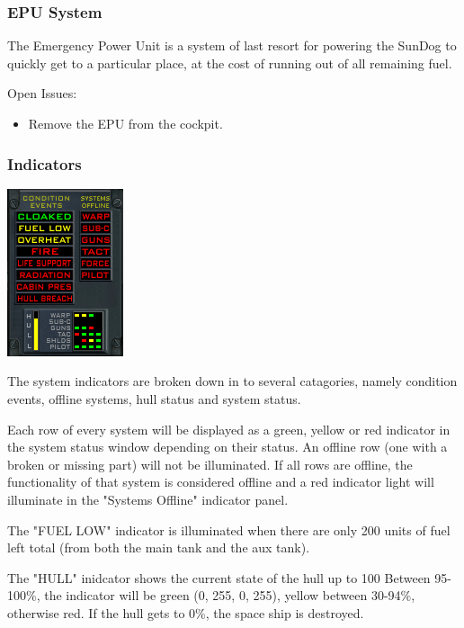 \subsubsection{EPU System}

The Emergency Power Unit is a system of last resort for powering the
SunDog to quickly get to a particular place, at the cost of running
out of all remaining fuel.

Open Issues:
\begin{itemize}
\item Remove the EPU from the cockpit.
\end{itemize}

\subsubsection{Indicators}
\includegraphics[scale=0.70]{images/indicators.png}

The system indicators are broken down in to several catagories, namely
condition events, offline systems, hull status and system status.

Each row of every system will be displayed as a green, yellow or red
indicator in the system status window depending on their status.  An
offline row (one with a broken or missing part) will not be illuminated.
If all rows are offline, the functionality of that system is considered
offline and a red indicator light will illuminate in the "Systems Offline"
indicator panel.

The "FUEL LOW" indicator is illuminated when there are only 200 units
of fuel left total (from both the main tank and the aux tank).

The "HULL" inidcator shows the current state of the hull up to 100%
Between 95-100\%, the indicator will be green (0, 255, 0, 255),
yellow between 30-94\%, otherwise red.  If the hull gets to 0\%, the
space ship is destroyed. 


